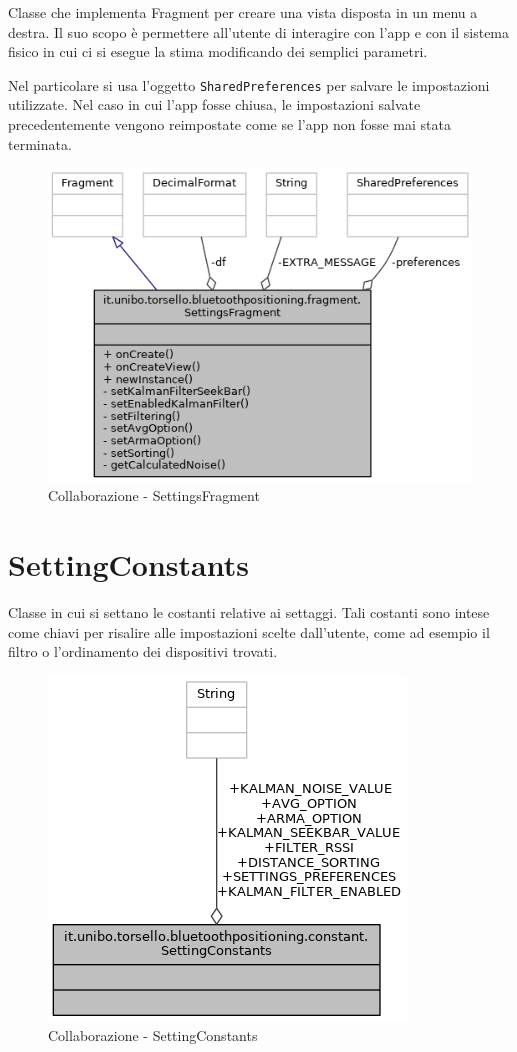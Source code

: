 Classe che implementa Fragment per creare una vista disposta in un menu a destra. Il suo scopo è permettere all'utente di interagire con l'app e con il sistema fisico in cui ci si esegue la stima modificando dei semplici parametri.

\newpage
Nel particolare si usa l'oggetto \texttt{SharedPreferences} per salvare le impostazioni utilizzate. Nel caso in cui l'app fosse chiusa, le impostazioni salvate precedentemente vengono reimpostate come se l'app non fosse mai stata terminata.

\begin{figure}[ph]
	\centering
	\includegraphics[width=0.8\linewidth]{img/uml/class/classit_1_1unibo_1_1torsello_1_1bluetoothpositioning_1_1fragment_1_1SettingsFragment__coll__graph.png}
	\caption{Collaborazione - SettingsFragment}
\end{figure}

\newpage
\section{SettingConstants}

Classe in cui si settano le costanti relative ai settaggi. Tali costanti sono intese come chiavi per risalire alle impostazioni scelte dall'utente, come ad esempio il filtro o l'ordinamento dei dispositivi trovati.
\begin{figure}[ph]
	\centering
	\includegraphics[width=0.5\linewidth]{img/uml/class/classit_1_1unibo_1_1torsello_1_1bluetoothpositioning_1_1constant_1_1SettingConstants__coll__graph.png}
	\caption{Collaborazione - SettingConstants}
\end{figure}

